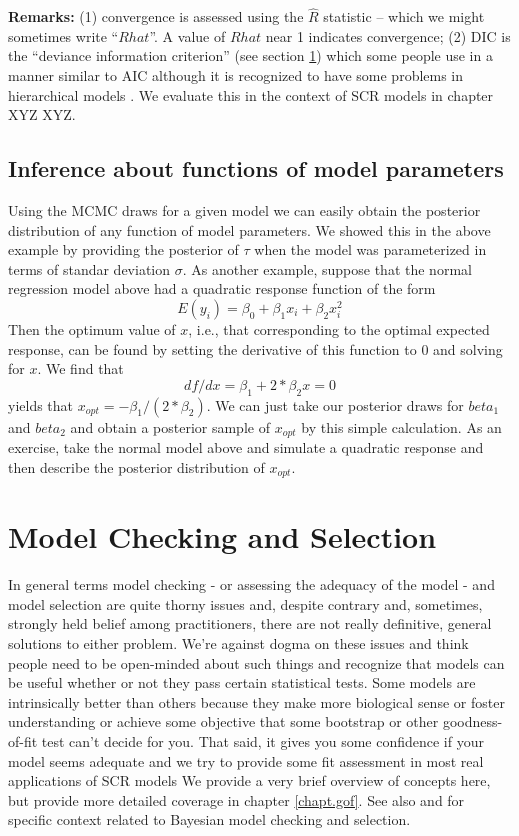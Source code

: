 {\bf Remarks:} (1) convergence is assessed using the $\hat{R}$
statistic -- which we might sometimes write ``$Rhat$''. A value of $Rhat$ near 1
indicates convergence; (2) DIC is the
``deviance information criterion'' \citep{spiegelhalter_etal:2002}
(see section \ref{glms.sec.modsel})
 which
some people use in a manner similar to AIC although it is recognized
to have some problems in hierarchical models \citep{millar:2009}. We
evaluate this in the context of SCR models in chapter XYZ XYZ.

\subsection{Inference about functions of model parameters}  
\label{glms.sec.xopt}

Using the MCMC draws for a given model we can easily obtain the
posterior distribution of any function of model parameters.  We showed
this in the above example by providing the posterior of $\tau$ when
the model was parameterized in terms of standar deviation $\sigma$.
 As another example, suppose that the
normal regression model above had a quadratic response function of the
form
\[
	E(y_i) = \beta_0 + \beta_1 x_i + \beta_2 x_{i}^{2}
\]
Then the optimum value of $x$, i.e., that corresponding to the optimal
expected response, can be found by setting the derivative of
this function to 0 and solving for $x$. We find that 
\[
df/dx = \beta_1 +
2*\beta_2 x = 0
\]
yields that $x_{opt} = -\beta_1/(2*\beta_2)$.  We can just
take our posterior draws for $beta_1$ and $beta_2$ and obtain a
posterior sample of $x_{opt}$ by this simple calculation. As an exercise, take
the normal model above and simulate a quadratic response and then
describe the posterior distribution of $x_{opt}$.


\section{Model Checking and Selection}
\label{glms.sec.modsel}

In general terms model checking - or assessing the adequacy of the
model - and model selection are quite thorny issues and, despite
contrary and, sometimes, strongly held belief among practitioners, there are not
really definitive, general solutions to either problem. We're against
dogma on these issues and think people need to be open-minded about
such things and recognize that models can be useful whether or not
they pass certain statistical tests. Some models are intrinsically
better than others because they make more biological sense or foster
understanding or achieve some objective that some  bootstrap
or other goodness-of-fit test can't decide for you. That said, it
gives you some confidence if your model seems adequate and we try to
provide some fit assessment in most real applications of SCR models
We provide a very brief overview of concepts here, but provide more
detailed coverage in chapter \ref{chapt.gof}.
See also  
\citet[][ch. xyz]{kery:2010} and
\citet[][ch. xyz]{link_barker:2009}
for specific context related to Bayesian 
model checking and selection.


